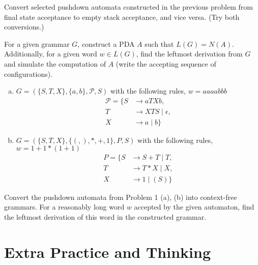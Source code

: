 \documentclass[a4paper,12pt]{amsart}
\begin{document}
\medskip\begin{problem}

    Convert selected pushdown automata constructed in the previous problem from final state acceptance to empty stack acceptance, and vice versa. (Try both conversions.)

\end{problem}


\medskip\begin{problem}

    For a given grammar $G$, construct a PDA $A$ such that $L(G)=N(A)$. Additionally, for a given word $w\in L(G)$, find the leftmost derivation from $G$ and simulate the computation of $A$ (write the accepting sequence of configurations).

    \medskip

    \begin{enumerate}[(a)]\setlength\itemsep{6pt}
        \item $G=(\{S,T,X\},\{a,b\},\mathcal P,S)$ with the following rules, $w=aaaabbb$
            \begin{align*}
        \mathcal P=\{S&\rightarrow aTXb, \\
        T&\rightarrow XTS\mid \epsilon,\\ 
        X&\rightarrow a\mid b\}
        \end{align*}
        \item $G=(\{S,T,X\},\{(,),*,+,1\},P,S)$ with the following rules, $w=1+1*(1+1)$
            \begin{align*}
        P=\{S&\rightarrow S+T\mid T, \\
        T&\rightarrow T*X\mid X,\\ 
        X&\rightarrow 1\mid (S)\}
        \end{align*}
    \end{enumerate}

\end{problem}
    

\medskip\begin{problem}

    Convert the pushdown automata from Problem 1 (a), (b) into context-free grammars. For a reasonably long word $w$ accepted by the given automaton, find the leftmost derivation of this word in the constructed grammar.

\end{problem}


\section*{Extra Practice and Thinking}
\end{document}

